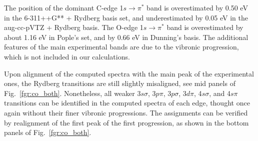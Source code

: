 \documentclass[journal=jctcce,manuscript=article]{achemso}
\begin{document}
The position of the dominant C-edge 1$s\to \pi^\ast$ band  is overestimated by 0.50 eV in the 6-311++G** + Rydberg basis set,
and underestimated by 0.05 eV in the aug-cc-pVTZ + Rydberg basis. 
The O-edge 1$s\to \pi^\ast$ band is overestimated by about 1.16 eV in Pople's set, and by 0.66 eV in Dunning's basis. The additional features of the main experimental bands are due to the vibronic progression, which is not included in our calculations. 

Upon alignment of the computed spectra with the main peak of the experimental ones, the Rydberg transitions are still slightly misaligned, see mid panels of Fig.~\ref{fgr:co_both}.
Nonetheless, all weaker 3$s\sigma$, 3$p\pi$, 3$p\sigma$, 3$d\pi$, 4$s\sigma$, and 4$s\pi$ transitions can be identified in the computed spectra of each edge, thought once again without their finer vibronic progressions. The assignments can be verified by realignment of the first peak of the first progression, as shown in the bottom panels of Fig.~\ref{fgr:co_both}. 

\end{document}
